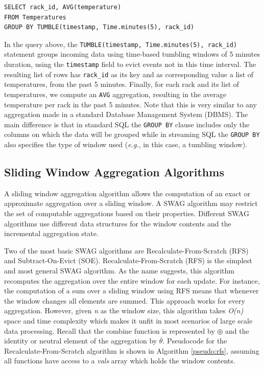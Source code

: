 \begin{verbatim}
SELECT rack_id, AVG(temperature)
FROM Temperatures
GROUP BY TUMBLE(timestamp, Time.minutes(5), rack_id)
\end{verbatim}

In the query above, the
\texttt{TUMBLE(timestamp, Time.minutes(5), rack\_id)} statement groups incoming data using time-based tumbling windows of 5 minutes duration, using the \texttt{timestamp} field to evict events not in this time interval. The resulting list of rows has \texttt{rack\_id} as its key and as corresponding value a list of temperatures, from the past 5 minutes. Finally, for each rack and its list of temperatures, we compute an \texttt{AVG} aggregation, resulting in the average temperature per rack in the past 5 minutes. Note that this is very similar to any aggregation made in a standard Database Management System (DBMS). The main difference is that in standard SQL the \texttt{GROUP BY} clause includes only the columns on which the data will be grouped while in streaming SQL the \texttt{GROUP BY} also specifies the type of window used (\textit{e.g.}, in this case, a tumbling window).


\subsection{Sliding Window Aggregation Algorithms} \label{sec:back-swag-algs}

A sliding window aggregation algorithm allows the computation of an exact or approximate aggregation over a sliding window. A SWAG algorithm may restrict the set of computable aggregations based on their properties. Different SWAG algorithms use different data structures for the window contents and the incremental aggregation state.

Two of the most basic SWAG algorithms are Recalculate-From-Scratch (RFS) and Subtract-On-Evict (SOE). Recalculate-From-Scratch (RFS) is the simplest and most general SWAG algorithm. As the name suggests, this algorithm recomputes the aggregation over the entire window for each update. For instance, the computation of a sum over a sliding window using RFS means that whenever the window changes all elements are summed. This approach works for every aggregation. However, given \textit{n} as the window size, this algorithm takes \textit{O(n)} space and time complexity which makes it unfit in most scenarios of large scale data processing. Recall that the combine function is represented by $\oplus$ and the identity or neutral element of the aggregation by $\overline{\theta}$. Pseudocode for the Recalculate-From-Scratch algorithm is shown in Algorithm \ref{pseudo:rfs}, assuming all functions have access to a \textit{vals} array which holds the window contents.
  

